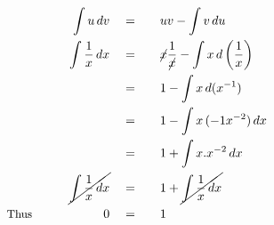 \begin{alignat*}{5}
&\,&\int u\,dv\quad&=\quad&&uv-\int v\,du\\
&\,&\int\frac{1}{x}\,dx\quad&=&&\cancel{x}\frac{1}{\cancel{x}}-\int x\,d\left(\frac{1}{x}\right)\\
&\,&\,&=&&1-\int x\,d(x^{-1})\\
&\,&\,&=&&1-\int x\,(-1x^{-2})\,dx\\
&\,&\,&=&&1+\int x.x^{-2}\,dx\\
&\,&\cancel{\int\frac{1}{x}\,dx}\quad&=&&1+\cancel{\int\frac{1}{x}\,dx}\\
&\small\text{Thus}\normalsize\qquad&0\quad&=&&1
\end{alignat*}

